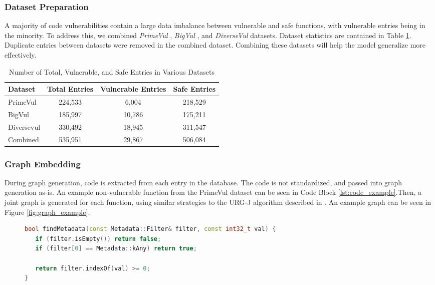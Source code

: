\documentclass{article}
\begin{document}
\subsubsection{Dataset Preparation}
A majority of code vulnerabilities contain a large data imbalance between vulnerable and safe functions, with vulnerable entries being in the minority. To address this, we combined \textit{PrimeVul} \cite{primevul}, \textit{BigVul} \cite{bigvul}, and \textit{DiverseVul} \cite{diversevul} datasets. Dataset statistics are contained in Table \ref{tab:dataset_entries}. Duplicate entries between datasets were removed in the combined dataset. Combining these datasets will help the model generalize more effectively.
\begin{table}[h]
    \centering
    \begin{tabular}{|l|c|c|c|}
        \hline
        Dataset & Total Entries & Vulnerable Entries & Safe Entries \\
        \hline
        PrimeVul & 224,533 & 6,004 & 218,529 \\
        BigVul & 185,997 & 10,786 & 175,211 \\
        Diversevul & 330,492 & 18,945 & 311,547 \\
        Combined & 535,951 & 29,867 & 506,084 \\
        \hline
    \end{tabular}
    \caption{Number of Total, Vulnerable, and Safe Entries in Various Datasets}
    \label{tab:dataset_entries}
\end{table}

\subsubsection{Graph Embedding}
During graph generation, code is extracted from each entry in the database. The code is not standardized, and passed into graph generation as-is. An example non-vulnerable function from the PrimeVul dataset can be seen in Code Block \ref{lst:code_example}.Then, a joint graph is generated for each function, using similar strategies to the URG-J algorithm described in \cite{jointgraph}. An example graph can be seen in Figure \ref{fig:graph_example}.

\begin{figure}[htbp]
  \centering
  \begin{minipage}{0.95\linewidth}
  \renewcommand{\lstlistingname}{Code Block}
  \begin{lstlisting}[language=C++, caption={Example C++ function that checks for metadata presence.}, label={lst:code_example}]
bool findMetadata(const Metadata::Filter& filter, const int32_t val) {
   if (filter.isEmpty()) return false;
   if (filter[0] == Metadata::kAny) return true;

   return filter.indexOf(val) >= 0;
}
  \end{lstlisting}
  \end{minipage}
\end{figure}
\end{document}
